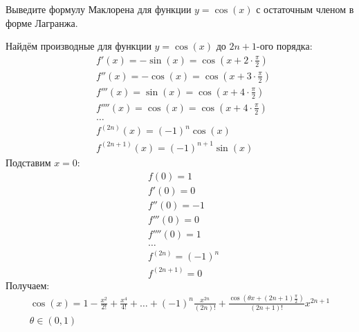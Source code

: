\begin{question}
    Выведите формулу Маклорена для функции $y = \cos(x)$ с остаточным членом в форме Лагранжа.
\end{question}
\begin{answer}
    Найдём производные для функции $y = \cos(x)$ до $2n + 1$-ого порядка:
    \begin{align*}
        &f'(x) = -\sin(x) = \cos(x + 2 \cdot \frac{\pi}{2}) \\
        &f''(x) = -\cos(x) = \cos(x + 3 \cdot \frac{\pi}{2}) \\
        &f'''(x) = \sin(x) = \cos(x + 4 \cdot \frac{\pi}{2}) \\
        &f''''(x) = \cos(x) = \cos(x + 4 \cdot \frac{\pi}{2}) \\
        &\ldots \\
        &f ^{(2n)}(x) = (-1) ^{n} \cos(x) \\
        &f ^{(2n+1)}(x) = (-1) ^{n+1} \sin(x)
    \end{align*}
    Подставим $x = 0$:
    \begin{align*}
        &f(0) = 1 \\
        &f'(0) = 0 \\
        &f''(0) = -1 \\
        &f'''(0) = 0 \\
        &f''''(0) = 1 \\
        &\ldots \\
        &f ^{(2n)} = (-1)^{n} \\
        &f ^{(2n+1)} = 0
    \end{align*}
    Получаем:
    \begin{gather*}
        \cos(x) = 1 - \frac{x^2}{2!} + \frac{x^4}{4!} + \ldots + (-1)^{n} \frac{x ^{2n}}{(2n)!} + \frac{\cos\left(\theta x + (2n+1) \frac{\pi}{2}\right)}{(2n+1)!} x ^{2n+1} \\
        \theta \in (0, 1)
    \end{gather*}
\end{answer}
\pagebreak



